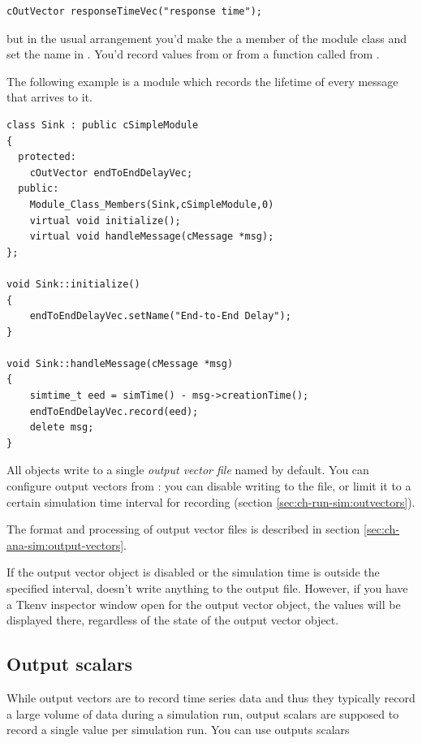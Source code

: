 \begin{verbatim}
cOutVector responseTimeVec("response time");
\end{verbatim}

but in the usual arrangement you'd make the  a member
of the module class and set the name in . You'd
record values from  or from a function called from
.

The following example is a  module which records the lifetime
of every message that arrives to it.

\begin{verbatim}
class Sink : public cSimpleModule
{
  protected:
    cOutVector endToEndDelayVec;
  public:
    Module_Class_Members(Sink,cSimpleModule,0)
    virtual void initialize();
    virtual void handleMessage(cMessage *msg);
};

void Sink::initialize()
{
    endToEndDelayVec.setName("End-to-End Delay");
}

void Sink::handleMessage(cMessage *msg)
{
    simtime_t eed = simTime() - msg->creationTime();
    endToEndDelayVec.record(eed);
    delete msg;
}
\end{verbatim}


All  objects write to a single \textit{output vector file}
named  by default.
You can configure output vectors from :
you can disable writing to the file, or limit it to a certain
simulation time interval for recording (section
\ref{sec:ch-run-sim:outvectors}).

The format and processing of output vector files is described in section
\ref{sec:ch-ana-sim:output-vectors}.

If the output vector object is disabled or the simulation time is
outside the specified interval,  doesn't write
anything to the output file. However, if you have a Tkenv inspector
window open for the output vector object,
the values will be displayed there, regardless of the state of the
output vector object.



\subsection{Output scalars}

While output vectors are to record time series data and thus they
typically record a large volume of data during a simulation run,
output scalars are supposed to record a single
value per simulation run. You can use outputs scalars

